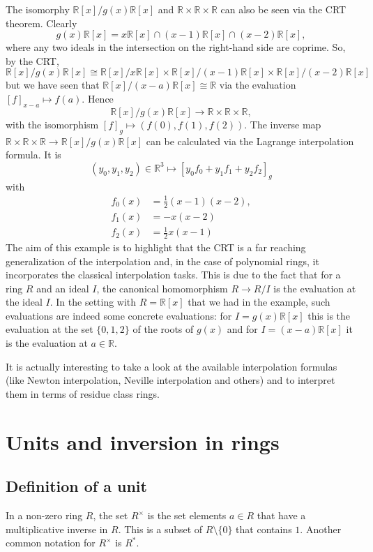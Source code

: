 \documentclass[11pt,a4paper]{amsart}
\newcommand{\R}{{\mathbb{R}}}
\begin{document}
The isomorphy $\R[x] / g(x) \R[x]$ and $\R \times \R \times \R$ can also be seen via the CRT theorem. Clearly 
\[
	g(x) \R[x] = x \R[x] \cap (x-1) \R[x] \cap (x-2) \R[x],
\]
where any two ideals in the intersection on the right-hand side are coprime. So, by the CRT, 
\[
	\R[x] / g(x) \R[x] \cong  \R[x] / x \R[x] \times  \R[x] / (x-1) \R[x] \times \R[x] / (x-2) \R[x] 
\]
but we have seen  that $\R[x] / (x-a) \R[x] \cong \R$ via the evaluation $[f]_{x-a} \mapsto f(a)$. Hence 
\[
	\R[x] / g(x) \R[x] \to \R \times \R \times \R,
\]
with the isomorphism $[f ]_g \mapsto (f(0), f(1), f(2))$. The inverse map $\R \times \R \times \R \to \R[x] / g(x) \R[x]$ can be calculated via the Lagrange interpolation formula. It is  
\[
	(y_0,y_1,y_2) \in \R^3 \mapsto [ y_0 f_0 + y_1 f_1 + y_2 f_2 ]_g
\]
with 
\begin{align*} 
	f_0(x) & = \frac{1}{2} (x-1) (x-2),
\\ f_1(x) & =  - x (x-2) 
\\ f_2(x) & = \frac{1}{2} x (x-1) 
\end{align*} 
The aim of this example is to highlight that the CRT is a far reaching generalization of the interpolation and, in the case of polynomial rings, it incorporates the classical interpolation tasks. This is due to the fact that for a ring $R$ and an ideal $I$, the canonical homomorphism $R \to R / I$ is the evaluation at the ideal $I$. In the setting with $R = \R[x]$ that we had in the example, such evaluations are indeed some concrete evaluations: for $I = g(x) \R[x]$ this is the evaluation at the set $\{0,1,2\}$ of the roots of $g(x)$ and for $I = (x-a)\R[x]$ it is the evaluation at $a \in \R$. 

 It is actually interesting to take a look at the available interpolation formulas (like Newton interpolation, Neville interpolation and others) and to interpret them in terms of residue class rings. 

\section{Units and inversion in rings}

\subsection{Definition of a unit} In a non-zero ring $R$, the set $R^\times$ is the set  elements $a \in R$ that have a multiplicative inverse in $R$. This is a subset of $R \setminus \{0\}$ that contains $1$. Another common notation for $R^\times$ is $R^\ast$. 
\end{document}
